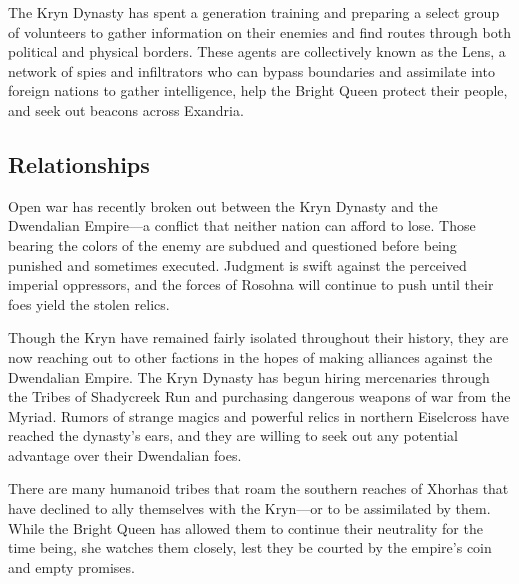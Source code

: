 \documentclass[10pt,a4paper,twoside,bg=print,twocolumn,openany,nodeprecatedcode]{dndbook}
\begin{document}
The Kryn Dynasty has spent a generation training and preparing a select group of volunteers to gather information on their enemies and find routes through both political and physical borders. These agents are collectively known as the Lens, a network of spies and infiltrators who can bypass boundaries and assimilate into foreign nations to gather intelligence, help the Bright Queen protect their people, and seek out beacons across Exandria.

\subsection{Relationships}
Open war has recently broken out between the Kryn Dynasty and the Dwendalian Empire—a conflict that neither nation can afford to lose. Those bearing the colors of the enemy are subdued and questioned before being punished and sometimes executed. Judgment is swift against the perceived imperial oppressors, and the forces of Rosohna will continue to push until their foes yield the stolen relics.

Though the Kryn have remained fairly isolated throughout their history, they are now reaching out to other factions in the hopes of making alliances against the Dwendalian Empire. The Kryn Dynasty has begun hiring mercenaries through the Tribes of Shadycreek Run and purchasing dangerous weapons of war from the Myriad. Rumors of strange magics and powerful relics in northern Eiselcross have reached the dynasty's ears, and they are willing to seek out any potential advantage over their Dwendalian foes.

There are many humanoid tribes that roam the southern reaches of Xhorhas that have declined to ally themselves with the Kryn—or to be assimilated by them. While the Bright Queen has allowed them to continue their neutrality for the time being, she watches them closely, lest they be courted by the empire's coin and empty promises.
\end{document}
